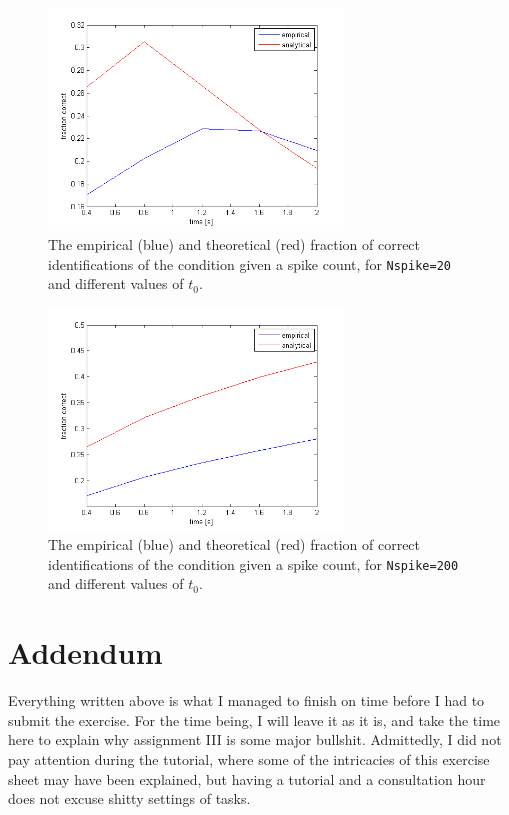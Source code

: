 \documentclass{scrartcl}
\begin{document}
\begin{figure}
\centering
\includegraphics[trim = {0.6cm 0 1.2cm 0.7cm}, width=0.7\textwidth, clip]{../pics/as3}
\caption{The empirical (blue) and theoretical (red) fraction of correct identifications of the condition given a spike count, for \texttt{Nspike=20} and different values of $t_0$.}
\label{as3}
\end{figure}

\begin{figure}
\centering
\includegraphics[trim = {0.6cm 0 1.2cm 0.7cm}, width=0.7\textwidth, clip]{../pics/as3_2}
\caption{The empirical (blue) and theoretical (red) fraction of correct identifications of the condition given a spike count, for \texttt{Nspike=200} and different values of $t_0$.}
\label{as32}
\end{figure}

\section*{Addendum}

Everything written above is what I managed to finish on time before I had to submit the exercise. For the time being, I will leave it as it is, and take the time here to explain why assignment III is some major bullshit. Admittedly, I did not pay attention during the tutorial, where some of the intricacies of this exercise sheet may have been explained, but having a tutorial and a consultation hour does not excuse shitty settings of tasks.
\end{document}
